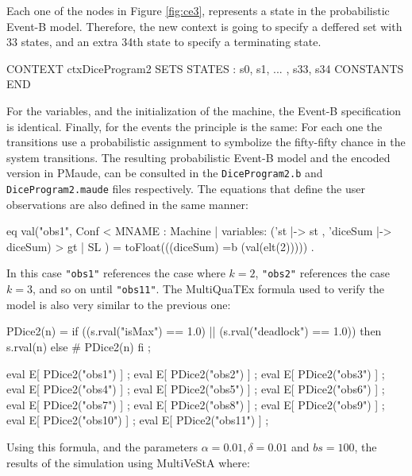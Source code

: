 Each one of the nodes in Figure \ref{fig:ce3}, represents a state in the probabilistic Event-B model. Therefore, the new context is going to specify a deffered set with 33 states, and an extra 34th state to specify a terminating state.
\begin{maude}

CONTEXT ctxDiceProgram2
SETS 
    STATES : { s0, s1, ... , s33, s34 }
CONSTANTS 
END
\end{maude}
For the variables, and the initialization of the machine, the Event-B specification is identical. Finally, for the events the principle is the same: For each one the transitions use a probabilistic assignment to symbolize the fifty-fifty chance in the system transitions. The resulting probabilistic Event-B model and the encoded version in PMaude, can be consulted in the \texttt{DiceProgram2.b} and \texttt{DiceProgram2.maude} files respectively. The equations that define the user observations are also defined in the same manner:
\begin{maude}

eq val("obs1", {Conf < MNAME : Machine | 
                     variables: ('st |-> st , 'diceSum |-> diceSum) >} 
                     {gt | SL}  ) = toFloat(((diceSum) =b (val(elt(2))))) .
\end{maude}
In this case \texttt{"obs1"} references the case where $k = 2$, \texttt{"obs2"} references the case $k = 3$, and so on until \texttt{"obs11"}. The MultiQuaTEx formula used to verify the model is also very similar to the previous one:
\begin{maude2}

PDice2(n) = if ((s.rval("isMax") == 1.0) || (s.rval("deadlock") == 1.0)) 
            then s.rval(n) else # PDice2(n) fi ;

eval E[ PDice2("obs1") ] ;
eval E[ PDice2("obs2") ] ;
eval E[ PDice2("obs3") ] ;
eval E[ PDice2("obs4") ] ;
eval E[ PDice2("obs5") ] ;
eval E[ PDice2("obs6") ] ;
eval E[ PDice2("obs7") ] ;
eval E[ PDice2("obs8") ] ;
eval E[ PDice2("obs9") ] ;
eval E[ PDice2("obs10") ] ;
eval E[ PDice2("obs11") ] ;
\end{maude2}
Using this formula, and the parameters $\alpha = 0.01, \delta = 0.01$ and $bs = 100$, the results of the simulation using MultiVeStA where:

